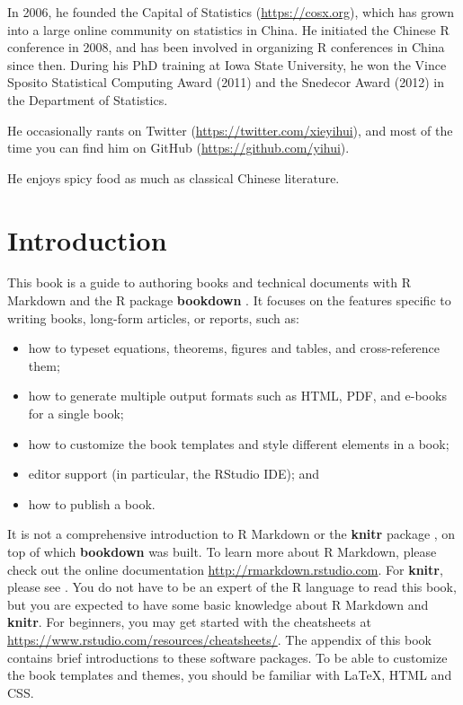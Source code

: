 \documentclass[
  12pt,
]{krantz}
\providecommand{\tightlist}{%
  \setlength{\itemsep}{0pt}\setlength{\parskip}{0pt}}
\theoremstyle{definition}
\theoremstyle{definition}
\theoremstyle{definition}
\theoremstyle{definition}
\theoremstyle{remark}
\begin{document}
In 2006, he founded the Capital of Statistics (\url{https://cosx.org}), which has grown into a large online community on statistics in China. He initiated the Chinese R conference in 2008, and has been involved in organizing R conferences in China since then. During his PhD training at Iowa State University, he won the Vince Sposito Statistical Computing Award (2011) and the Snedecor Award (2012) in the Department of Statistics.

He occasionally rants on Twitter (\url{https://twitter.com/xieyihui}), and most of the time you can find him on GitHub (\url{https://github.com/yihui}).

He enjoys spicy food as much as classical Chinese literature.

\mainmatter

\chapter{Introduction}\label{introduction}

This book is a guide to authoring books and technical documents with R Markdown \citep{R-rmarkdown} and the R package \textbf{bookdown} \citep{R-bookdown}. It focuses on the features specific to writing books, long-form articles, or reports, such as:

\begin{itemize}
\tightlist
\item
  how to typeset equations, theorems, figures and tables, and cross-reference them;
\item
  how to generate multiple output formats such as HTML, PDF, and e-books for a single book;
\item
  how to customize the book templates and style different elements in a book;
\item
  editor support (in particular, the RStudio IDE); and
\item
  how to publish a book.
\end{itemize}

It is not a comprehensive introduction to R Markdown or the \textbf{knitr} package \citep{R-knitr}, on top of which \textbf{bookdown} was built. To learn more about R Markdown, please check out the online documentation \url{http://rmarkdown.rstudio.com}. For \textbf{knitr}, please see \citet{xie2015}. You do not have to be an expert of the R language \citep{R-base} to read this book, but you are expected to have some basic knowledge about R Markdown and \textbf{knitr}. For beginners, you may get started with the cheatsheets at \url{https://www.rstudio.com/resources/cheatsheets/}. The appendix of this book contains brief introductions to these software packages. To be able to customize the book templates and themes, you should be familiar with LaTeX, HTML and CSS.
\end{document}

